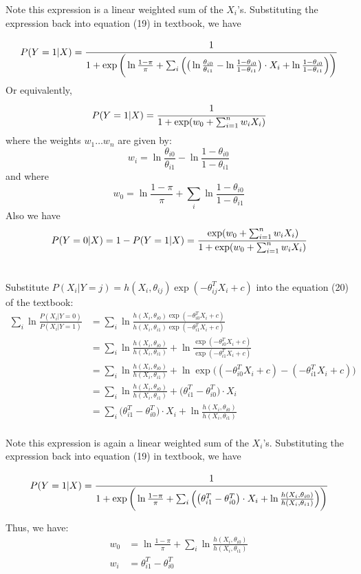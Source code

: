 \documentclass[12pt, letterpaper]{article}
\begin{document}
Note this expression is a linear weighted sum of the $X_i$'s. Substituting
the expression back into equation (19) in textbook, we have

\[P(Y=1|X)=\cfrac{1}{1+\exp\bigg(\ln\frac{1-\pi}{\pi}+\sum_i\Big(\big(\ln\frac{\theta_{i0}}{\theta_{i1}}-\ln\frac{1-\theta_{i0}}{1-\theta_{i1}}\big)\cdot{X_i}+\ln\frac{1-\theta_{i0}}{1-\theta_{i1}}\Big)\bigg)}\]
Or equivalently,
\[P(Y=1|X)=\cfrac{1}{1+\exp(w_0+\sum_{i=1}^nw_iX_i)}\]
where the weights $w_1\ldots w_n$ are given by:
\[w_i=\ln\frac{\theta_{i0}}{\theta_{i1}}-\ln\frac{1-\theta_{i0}}{1-\theta_{i1}}\]
and where
\[w_0=\ln\frac{1-\pi}{\pi}+\sum_i\ln\frac{1-\theta_{i0}}{1-\theta_{i1}}\]
Also we have
\[P(Y=0|X)=1-P(Y=1|X)=\cfrac{\exp(w_0+\sum_{i=1}^nw_iX_i)}{1+\exp(w_0+\sum_{i=1}^nw_iX_i)}\]

\section{}

Substitute $P(X_i|Y=j)=h(X_i,\theta_{ij})\exp(-\theta_{ij}^TX_i+c)$ into the equation (20) of the textbook:
\begin{align*}
\sum_i\ln\frac{P(X_i|Y=0)}{P(X_i|Y=1)}
&=\sum_i\ln\frac{h(X_i,\theta_{i0})\exp(-\theta_{i0}^TX_i+c)}{h(X_i,\theta_{i1})\exp(-\theta_{i1}^TX_i+c)}\\
&=\sum_i\ln\frac{h(X_i,\theta_{i0})}{h(X_i,\theta_{i1})}+\ln\frac{\exp(-\theta_{i0}^TX_i+c)}{\exp(-\theta_{i1}^TX_i+c)}\\
&=\sum_i\ln\frac{h(X_i,\theta_{i0})}{h(X_i,\theta_{i1})}+\ln\exp\big({(-\theta_{i0}^TX_i+c)}-{(-\theta_{i1}^TX_i+c)}\big)\\
&=\sum_i\ln\frac{h(X_i,\theta_{i0})}{h(X_i,\theta_{i1})}+\big({\theta_{i1}^T-\theta_{i0}^T\big)\cdot X_i}\\
&=\sum_i\big({\theta_{i1}^T-\theta_{i0}^T\big)\cdot X_i}+\ln\frac{h(X_i,\theta_{i0})}{h(X_i,\theta_{i1})}\\
\end{align*}

Note this expression is again a linear weighted sum of the $X_i$'s. Substituting
the expression back into equation (19) in textbook, we have

\[P(Y=1|X)=\cfrac{1}{1+\exp\bigg(\ln\frac{1-\pi}{\pi}+\sum_i\Big(\big({\theta_{i1}^T-\theta_{i0}^T\big)\cdot X_i}+\ln\frac{h(X_i,\theta_{i0})}{h(X_i,\theta_{i1})}\Big)\bigg)}\]

Thus, we have:
\begin{align*}
w_0&=\ln\frac{1-\pi}{\pi}+\sum_i\ln\frac{h(X_i,\theta_{i0})}{h(X_i,\theta_{i1})}\\
w_i&=\theta_{i1}^T-\theta_{i0}^T
\end{align*}
\end{document}

